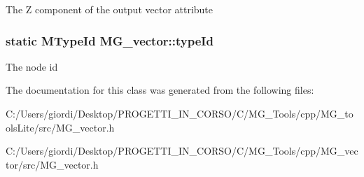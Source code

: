 The Z component of the output vector attribute \hypertarget{class_m_g__vector_ac4417888ca111086a0b3e5778041cb7e}{
\subsubsection[{type\-Id}]{\setlength{\rightskip}{0pt plus 5cm}static M\-Type\-Id M\-G\-\_\-vector\-::type\-Id\hspace{0.3cm}{\ttfamily [static]}}}\label{class_m_g__vector_ac4417888ca111086a0b3e5778041cb7e}
The node id 

The documentation for this class was generated from the following files\-:\begin{DoxyCompactItemize}
\item 
C\-:/\-Users/giordi/\-Desktop/\-P\-R\-O\-G\-E\-T\-T\-I\-\_\-\-I\-N\-\_\-\-C\-O\-R\-S\-O/\-C/\-M\-G\-\_\-\-Tools/cpp/\-M\-G\-\_\-tools\-Lite/src/M\-G\-\_\-vector.\-h\item 
C\-:/\-Users/giordi/\-Desktop/\-P\-R\-O\-G\-E\-T\-T\-I\-\_\-\-I\-N\-\_\-\-C\-O\-R\-S\-O/\-C/\-M\-G\-\_\-\-Tools/cpp/\-M\-G\-\_\-vector/src/M\-G\-\_\-vector.\-h\end{DoxyCompactItemize}
